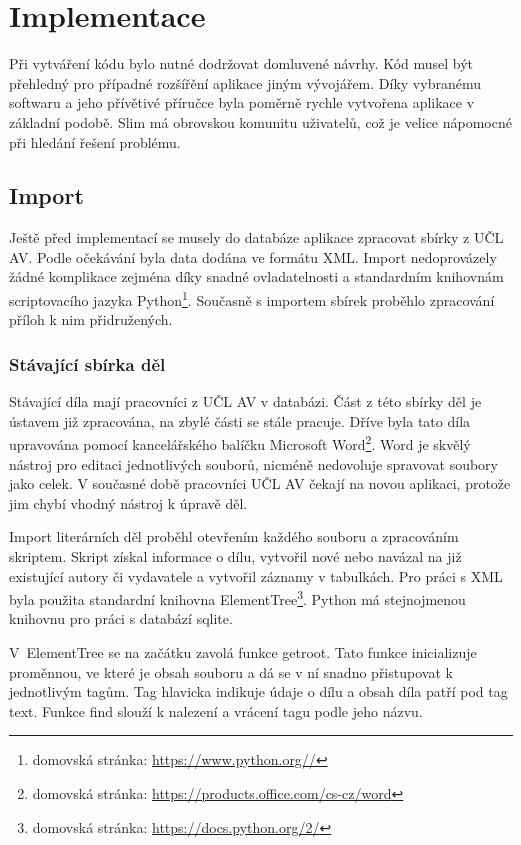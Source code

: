 \chapter{Implementace}
    Při vytváření kódu bylo nutné dodržovat domluvené návrhy. Kód musel být přehledný pro případné rozšířění aplikace jiným vývojářem. Díky vybranému softwaru a jeho přívětivé příručce byla poměrně rychle vytvořena aplikace v základní podobě. Slim má obrovskou komunitu uživatelů, což je velice nápomocné při hledání řešení problému. 

    \section{Import}
        Ještě před implementací se musely do databáze aplikace zpracovat sbírky z UČL AV. Podle očekávání byla data dodána ve formátu XML. Import nedoprovázely žádné komplikace zejména díky snadné ovladatelnosti a standardním knihovnám scriptovacího jazyka Python\footnote{domovská stránka: \url{https://www.python.org//}}. Současně s importem sbírek proběhlo zpracování příloh k nim přidružených.
        
        \subsection{Stávající sbírka děl}
            Stávající díla mají pracovníci z UČL AV v databázi. Část z této sbírky děl je ústavem již zpracována, na zbylé části se stále pracuje. Dříve byla tato díla upravována pomocí kancelářského balíčku Microsoft Word\footnote{domovská stránka: \url{https://products.office.com/cs-cz/word}}. Word je skvělý nástroj pro editaci jednotlivých souborů, nicméně nedovoluje spravovat soubory jako celek. V současné době pracovníci UČL AV čekají na novou aplikaci, protože jim chybí vhodný nástroj k úpravě děl.
            
            Import literárních děl proběhl otevřením každého souboru a zpracováním skriptem. Skript získal informace o dílu, vytvořil nové nebo navázal na již existující autory či vydavatele a vytvořil záznamy v tabulkách. Pro práci s XML byla použita standardní knihovna ElementTree\footnote{domovská stránka: \url{https://docs.python.org/2/}}. Python má stejnojmenou knihovnu pro práci s databází sqlite.
            
            V~ElementTree se na začátku zavolá funkce getroot. Tato funkce inicializuje proměnnou, ve které je obsah souboru a  dá se v ní snadno přistupovat k jednotlivým tagům. Tag hlavicka indikuje údaje o dílu a obsah díla patří pod tag text. Funkce find slouží k nalezení a vrácení tagu podle jeho názvu.
            
